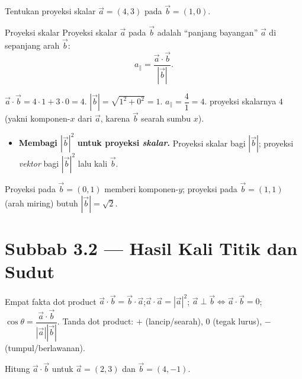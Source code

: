 \begin{soalbox}{}
Tentukan proyeksi skalar $\vec a=(4,3)$ pada $\vec b=(1,0)$.
\end{soalbox}

\begin{ingat}{Proyeksi skalar}
Proyeksi skalar $\vec a$ pada $\vec b$ adalah ``panjang bayangan'' $\vec a$ di
sepanjang arah $\vec b$:
\[
a_\parallel=\frac{\vec a\cdot\vec b}{|\vec b|}.
\]
\end{ingat}

\jawab
{} $\vec a\cdot\vec b=4\cdot1+3\cdot0=4$.
 $|\vec b|=\sqrt{1^2+0^2}=1$.
 $a_\parallel=\dfrac{4}{1}=4$.
\jadi proyeksi skalarnya $4$ (yakni komponen-$x$ dari $\vec a$, karena $\vec b$
searah sumbu $x$).

\begin{jebakan}
\begin{itemize}[leftmargin=*,topsep=2pt]
  \item \textbf{Membagi $|\vec b|^2$ untuk proyeksi \emph{skalar}.} Proyeksi
  skalar bagi $|\vec b|$; proyeksi \emph{vektor} bagi $|\vec b|^2$ lalu kali
  $\vec b$.
\end{itemize}
\end{jebakan}

\begin{variasi}
Proyeksi pada $\vec b=(0,1)$ memberi komponen-$y$; proyeksi pada $\vec b=(1,1)$
(arah miring) butuh $|\vec b|=\sqrt2$.
\end{variasi}

\section*{Subbab 3.2 — Hasil Kali Titik dan Sudut}

\begin{ingat}{Empat fakta dot product}
$\vec a\cdot\vec b=\vec b\cdot\vec a$;\quad $\vec a\cdot\vec a=|\vec a|^2$;\quad
$\vec a\perp\vec b\iff\vec a\cdot\vec b=0$;\quad
$\cos\theta=\dfrac{\vec a\cdot\vec b}{|\vec a||\vec b|}$.
Tanda dot product: $+$ (lancip/searah), $0$ (tegak lurus), $-$ (tumpul/berlawanan).
\end{ingat}

\begin{soalbox}{}
Hitung $\vec a\cdot\vec b$ untuk $\vec a=(2,3)$ dan $\vec b=(4,-1)$.
\end{soalbox}

